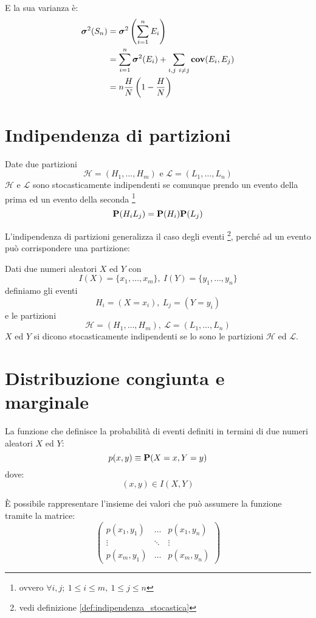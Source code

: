 E la sua varianza è:
\begin{align*}
  \var(S_n) &= \var \left(\sum_{i = 1}^n E_i\right) \\
  &= \sum_{i = 1}^n \var(E_i) + \sum_{i,j ~ i \neq j} \cov(E_i, E_j) \\ %
  &= n \frac{H}{N} \left( 1 - \frac{H}{N} \right)
\end{align*}

\section{Indipendenza di partizioni} %
\begin{definition}
  \label{def:indipendenza_di_partizioni}
  Date due partizioni
  \[
    \mathcal{H} = (H_1, \ldots, H_m) \text{ e } \mathcal{L} = (L_1, \ldots, L_n)
  \]
  \( \mathcal{H} \) e \( \mathcal{L} \) sono stocasticamente indipendenti se comunque prendo un evento della prima ed un evento della seconda
  \footnote{ovvero \( \forall i, j; ~ 1 \le i \le m, ~ 1 \le j \le n \)}
  \[
    \mathbf{P}(H_i L_j) = \mathbf{P}(H_i) \mathbf{P}(L_j)
  \]
\end{definition}

L'indipendenza di partizioni generalizza il caso degli eventi
\footnote{vedi definizione \ref{def:indipendenza_stocastica}},
perché ad un evento può corrispondere una partizione:
\begin{definition}
  Dati due numeri aleatori \( X \) ed \( Y \) con
  \[
    I(X) = \{ x_1, \ldots, x_m \}, ~ I(Y) = \{ y_1, \ldots, y_n \}
  \]
  definiamo gli eventi
  \[
    H_i = (X = x_i), ~ L_j = (Y = y_i)
  \]
  e le partizioni
  \[
    \mathcal{H} = (H_1, \ldots, H_m), ~ \mathcal{L} = (L_1, \ldots, L_n)
  \]
  \( X \) ed \( Y \) si dicono stocasticamente indipendenti se lo sono le partizioni \( \mathcal{H} \) ed \( \mathcal{L} \).
\end{definition}

\section{Distribuzione congiunta e marginale} %
\begin{definition}
  \label{def:distribuzione_congiunta}
  La funzione che definisce la probabilità di eventi definiti in termini di due numeri aleatori \( X \) ed \( Y \):
  \[
    p(x,y) \equiv \mathbf{P}(X = x, Y = y)
  \]
  dove:
  \[
    (x,y) \in I(X,Y)
  \]
\end{definition}
È possibile rappresentare l'insieme dei valori che può assumere la funzione tramite la matrice:
\[
  \begin{pmatrix}
    p(x_1, y_1) & \dots & p(x_1, y_n) \\
    \vdots & \ddots & \vdots \\
    p(x_m, y_1) & \dots & p(x_m, y_n)
  \end{pmatrix}
\]

